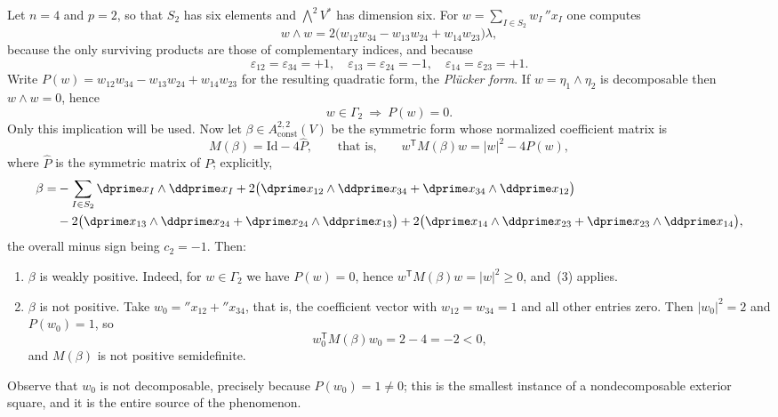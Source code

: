 \begin{example}
\label{ex:ch09-weak-not-positive}
Let $n=4$ and $p=2$, so that $S_2$ has six elements and
$\bigwedge^2V^*$ has dimension six.  For
$w=\sum_{I\in S_2}w_I\,\dprime x_I$ one computes
\[
 w\wedge w
 =2\bigl(w_{12}w_{34}-w_{13}w_{24}+w_{14}w_{23}\bigr)\lambda,
\]
because the only surviving products are those of complementary indices, and
because
\[
 \varepsilon_{12}=\varepsilon_{34}=+1,\quad
 \varepsilon_{13}=\varepsilon_{24}=-1,\quad
 \varepsilon_{14}=\varepsilon_{23}=+1 .
\]
Write $P(w)=w_{12}w_{34}-w_{13}w_{24}+w_{14}w_{23}$ for the resulting
quadratic form, the \emph{Pl\"ucker form}.  If $w=\eta_1\wedge\eta_2$ is
decomposable then $w\wedge w=0$, hence
\[
 w\in\Gamma_2\ \Longrightarrow\ P(w)=0 .
\]
Only this implication will be used.  Now let
$\beta\in A_{\mathrm{const}}^{2,2}(V)$ be the
symmetric form whose normalized coefficient matrix is
\[
 M(\beta)=\mathrm{Id}-4\widehat P,
 \qquad\text{that is,}\qquad
 w^{\mathsf T}M(\beta)w=|w|^2-4P(w),
\]
where $\widehat P$ is the symmetric matrix of $P$; explicitly,
\[
\begin{aligned}
 \beta=&-\sum_{I\in S_2}\dprime x_I\wedge\ddprime x_I
   +2\bigl(\dprime x_{12}\wedge\ddprime x_{34}
          +\dprime x_{34}\wedge\ddprime x_{12}\bigr)\\
  &-2\bigl(\dprime x_{13}\wedge\ddprime x_{24}
          +\dprime x_{24}\wedge\ddprime x_{13}\bigr)
   +2\bigl(\dprime x_{14}\wedge\ddprime x_{23}
          +\dprime x_{23}\wedge\ddprime x_{14}\bigr),
\end{aligned}
\]
the overall minus sign being $c_2=-1$.  Then:
\begin{enumerate}
\item $\beta$ is weakly positive.  Indeed, for $w\in\Gamma_2$ we have
  $P(w)=0$, hence $w^{\mathsf T}M(\beta)w=|w|^2\geq0$, and
  \,(3) applies.
\item $\beta$ is not positive.  Take
  $w_0=\dprime x_{12}+\dprime x_{34}$, that is, the coefficient vector with
  $w_{12}=w_{34}=1$ and all other entries zero.  Then $|w_0|^2=2$ and
  $P(w_0)=1$, so
  \[
   w_0^{\mathsf T}M(\beta)w_0=2-4=-2<0,
  \]
  and $M(\beta)$ is not positive semidefinite.
\end{enumerate}
Observe that $w_0$ is not decomposable, precisely because $P(w_0)=1\neq0$;
this is the smallest instance of a nondecomposable exterior square, and it is
the entire source of the phenomenon.
\end{example}


